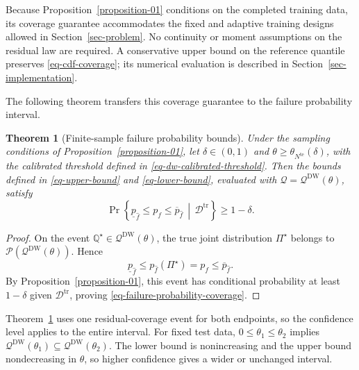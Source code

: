 \documentclass[review,11pt,3p,authoryear,nopreprintline]{elsarticle}
\newtheorem{theorem}{Theorem}
\begin{document}
Because Proposition~\ref{proposition-01} conditions on the completed training data, its coverage guarantee accommodates the fixed and adaptive training designs allowed in Section~\ref{sec-problem}. No continuity or moment assumptions on the residual law are required. A conservative upper bound on the reference quantile preserves \eqref{eq-cdf-coverage}; its numerical evaluation is described in Section~\ref{sec-implementation}.

The following theorem transfers this coverage guarantee to the failure probability interval.

\begin{theorem}[Finite-sample failure probability bounds]
  \label{theorem-01}
  Under the sampling conditions of Proposition~\ref{proposition-01}, let $\delta\in(0,1)$ and $\theta\ge\theta_{N^{\mathrm{te}}}(\delta)$, with the calibrated threshold defined in \eqref{eq-dw-calibrated-threshold}. Then the bounds defined in \eqref{eq-upper-bound} and \eqref{eq-lower-bound}, evaluated with $\mathcal Q=\mathcal Q^{\mathrm{DW}}(\theta)$, satisfy
  \begin{equation}
    \Pr\left\{\underline p_{\hat f}\le p_f\le\overline p_{\hat f}\,\middle|\,\mathcal D^{\mathrm{tr}}\right\}\ge1-\delta.
    \label{eq-failure-probability-coverage}
  \end{equation}
\end{theorem}

\begin{proof}
  On the event $\mathbb Q^\star\in\mathcal Q^{\mathrm{DW}}(\theta)$, the true joint distribution $\Pi^\star$ belongs to $\mathcal P\left(\mathcal Q^{\mathrm{DW}}(\theta)\right)$. Hence
  \[
    \underline p_{\hat f}\le p_{\hat f}(\Pi^\star)=p_f\le\overline p_{\hat f}.
  \]
  By Proposition~\ref{proposition-01}, this event has conditional probability at least $1-\delta$ given $\mathcal D^{\mathrm{tr}}$, proving \eqref{eq-failure-probability-coverage}.
\end{proof}

Theorem~\ref{theorem-01} uses one residual-coverage event for both endpoints, so the confidence level applies to the entire interval. For fixed test data, $0\le\theta_1\le\theta_2$ implies $\mathcal Q^{\mathrm{DW}}(\theta_1)\subseteq\mathcal Q^{\mathrm{DW}}(\theta_2)$. The lower bound is nonincreasing and the upper bound nondecreasing in $\theta$, so higher confidence gives a wider or unchanged interval.
\end{document}
